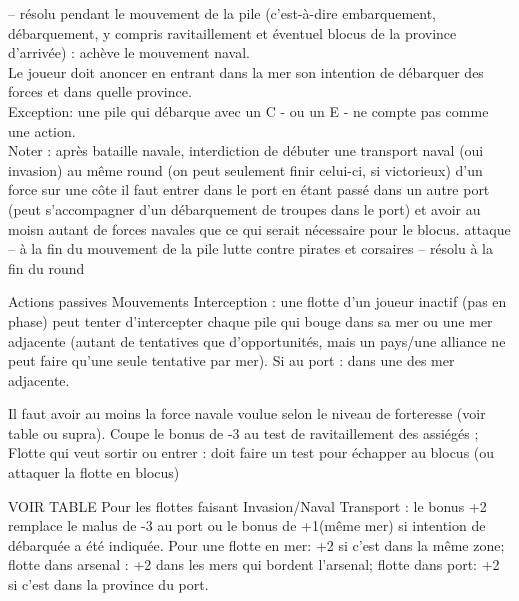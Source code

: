 
\bparag[Exploration] -- résolu pendant le mouvement de la pile
(c'est-à-dire embarquement, débarquement, y compris ravitaillement et 
éventuel blocus de la province d'arrivée) : achève le mouvement naval. \\
Le joueur doit anoncer en entrant dans la mer son intention de débarquer
des forces et dans quelle province. \\
Exception: une pile qui débarque avec un C - ou un E - ne compte pas comme une action. \\
Noter : après bataille navale, interdiction de débuter une transport naval (oui invasion) au
même round (on peut seulement finir celui-ci, si victorieux)
 d'un force sur une côte
  il faut entrer dans le port en étant passé
dans un autre port (peut s'accompagner d'un débarquement de
troupes dans le port) et avoir au moisn autant de forces navales que ce qui serait
nécessaire pour le blocus.
\bparag attaque -- à la fin du mouvement de la pile
\bparag lutte contre pirates et corsaires -- résolu à la fin du round

\aparag Actions passives
\bparag Mouvements
\bparag Interception : une flotte d'un joueur inactif (pas en phase)
peut tenter d'intercepter chaque pile qui bouge dans sa mer ou une mer
adjacente (autant de tentatives que d'opportunités, mais un pays/une
alliance ne peut faire qu'une seule tentative par mer).
Si au port : dans une des mer adjacente.

\aparag[Blocus]
Il faut avoir au moins la force navale voulue selon le niveau de forteresse (voir table ou supra).
\bparag Coupe le bonus de -3 au test de ravitaillement des assiégés ;
\bparag Flotte qui veut sortir ou entrer : doit faire un test pour échapper au blocus
(ou attaquer la flotte en blocus)

 VOIR TABLE
\interceptiona
\bparag Pour les flottes faisant Invasion/Naval Transport : le bonus +2 remplace
le malus de -3 au port ou le bonus de +1(même mer) si intention de
débarquée a été indiquée. Pour une flotte en mer: +2 si c'est dans la
même zone; flotte dans arsenal : +2 dans les mers qui bordent l'arsenal;
flotte dans port: +2 si c'est dans la province du port.

%


